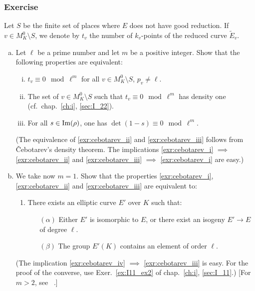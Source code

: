 \subsubsection*{Exercise}
Let $S$ be the finite set of places where $E$ does not have good reduction. If
$v \in M_K^0 \setminus S$, we denote by $t_v$ the number of $k_v$-points of the
reduced curve $\widetilde{E}_v$.
\begin{enumerate}[(a)]
	\item Let $\ell$ be a prime number and let $m$ be a positive integer.
		Show that the following properties are equivalent:
	\begin{enumerate}[(i)]
		\item\label{exr:cebotarev_i}
			$t_v \equiv 0 \mod{\ell^m}$ for all $v \in M_K^0 \setminus S$, $p_v \ne \ell$.
		\item\label{exr:cebotarev_ii}
			The set of $v \in M_K^0 \setminus S$ such that $t_v
			\equiv 0 \mod{\ell^m}$ has density one (cf.\ 
			chap.~\ref{ch:i}, \ref{sec:I_22}).
		\item\label{exr:cebotarev_iii}
			For all $s \in \operatorname{Im}(\rho)$, one has $\det(1-s) \equiv 0 \mod{\ell^m}$.
	\end{enumerate}
	(The equivalence of \ref{exr:cebotarev_ii} and \ref{exr:cebotarev_iii}
	follows from \v Cebotarev's density theorem. The implications
	\ref{exr:cebotarev_i} $\implies$ \ref{exr:cebotarev_ii} and
	\ref{exr:cebotarev_iii} $\implies$ \ref{exr:cebotarev_i} are easy.)

	\item We take now $m = 1$. Show that the properties
		\ref{exr:cebotarev_i}, \ref{exr:cebotarev_ii} and
		\ref{exr:cebotarev_iii} are equivalent to:
	\begin{enumerate}[resume*]
		\item\label{exr:cebotarev_iv}
			There exists an elliptic curve $E'$ over $K$ such that:
		\begin{itemize}
			\item[$(\alpha)$]
				Either $E'$ is isomorphic to $E$, or there
				exist an isogeny $E' \to E$ of degree $\ell$.
			\item[$(\beta)$]
				The group $E'(K)$ contains an element of order
				$\ell$.
		\end{itemize}
	\end{enumerate}
	(The implication \ref{exr:cebotarev_iv} $\implies$
	\ref{exr:cebotarev_iii} is easy. For the proof of the converse, use
	Exer.~\ref{ex:I11_ex2} of chap.~\ref{ch:i}, \ref{sec:I_11}.)
	[For $m > 2$, see \citeauthor{64}~\cite{64}.]
\end{enumerate}

